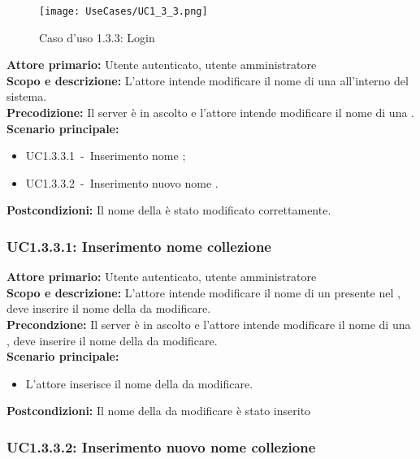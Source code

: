 \documentclass{scalatekids-article}
\begin{document}
\begin{figure}[H]
  \begin{center}
    \texttt{[image: UseCases/UC1\_3\_3.png]}
    \caption{Caso d'uso 1.3.3: Login}
  \end{center}
\end{figure}
\textbf{Attore primario:} Utente autenticato, utente amministratore\\
\textbf{Scopo e descrizione:} L’attore intende modificare il nome di una  all'interno del sistema.\\
\textbf{Precodizione:} Il server è in ascolto e l’attore intende modificare il nome di una .\\
\textbf{Scenario principale:}
\begin{itemize}
\item UC1.3.3.1\ -\ Inserimento nome ;
\item UC1.3.3.2\ -\ Inserimento nuovo nome .
\end{itemize}
\textbf{Postcondizioni:} Il nome della  è stato modificato correttamente.

\subsubsection{UC1.3.3.1: Inserimento nome collezione}

\textbf{Attore primario:} Utente autenticato, utente amministratore\\
\textbf{Scopo e descrizione:} L'attore intende modificare il nome di un  presente nel , deve inserire il nome della  da modificare.\\
\textbf{Precondzione:} Il server è in ascolto e l'attore intende modificare il nome di una , deve inserire il nome della  da modificare.\\
\textbf{Scenario principale:}
\begin{itemize}
\item L'attore inserisce il nome della  da modificare.
\end{itemize}
\textbf{Postcondizioni:} Il nome della  da modificare è stato inserito

\subsubsection{UC1.3.3.2: Inserimento nuovo nome collezione}
\end{document}
